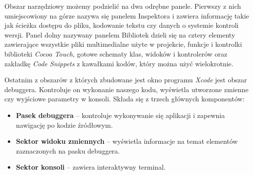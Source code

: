 \documentclass{iiuwb}
\begin{document}
Obszar narzędziowy możemy podzielić na dwa odrębne panele. Pierwszy z nich umiejscowiony na górze nazywa się panelem Inspektora i zawiera informację takie jak ścieżka dostępu do pliku, kodowanie tekstu czy danych o systemie kontroli wersji. Panel dolny nazywany panelem Bibliotek dzieli się na cztery elementy zawierające wszystkie pliki multimedialne użyte w projekcie, funkcje i kontrolki biblioteki \textit{Cocoa Touch}, gotowe schematy klas, widoków i kontrolerów oraz zakładkę \textit{Code Snippets} z kawałkami kodów, który można użyć wielokrotnie.

Ostatnim z obszarów z których zbudowane jest okno programu \textit{Xcode} jest obszar debuggera. Kontroluje on wykonanie naszego kodu, wyświetla utworzone zmienne czy wyjściowe parametry w konsoli. Składa się z trzech głównych komponentów:
\begin{itemize}
\item \textbf{Pasek debuggera} -- kontroluje wykonywanie się aplikacji i zapewnia nawigację po kodzie źródłowym. 
\item \textbf{Sektor widoku zmiennych} -- wyświetla informacje na temat elementów zaznaczonych na pasku debuggera.
\item \textbf{Sektor konsoli} -- zawiera interaktywny terminal.
\end{itemize}
\end{document}
